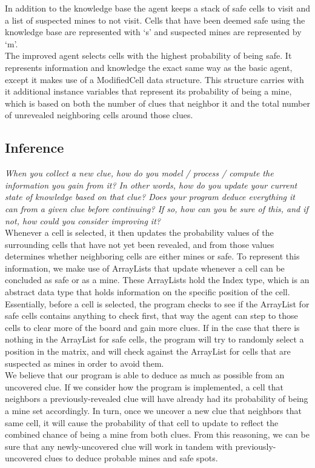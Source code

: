 \documentclass[11pt]{article} %
\begin{document}
In addition to the knowledge base the agent keeps a stack of safe cells to visit and a list of suspected mines to not visit. Cells that have been deemed safe using the knowledge base are represented with ‘s’ and suspected mines are represented by ‘m’.\\

The improved agent selects cells with the highest probability of being safe. It represents information and knowledge the exact same way as the basic agent, except it makes use of a ModifiedCell data structure. This structure carries with it additional instance variables that represent its probability of being a mine, which is based on both the number of clues that neighbor it and the total number of unrevealed neighboring cells around those clues. 

\subsection{Inference}

\textit{When you collect a new clue, how do you model / process / compute the information you gain from it? In other words, how do you update your current state of knowledge based on that clue? Does your program deduce everything it can from a given clue before continuing? If so, how can you be sure of this, and if not, how could you consider improving it?}\\

Whenever a cell is selected, it then updates the probability values of the surrounding cells that have not yet been revealed, and from those values determines whether neighboring cells are either mines or safe. To represent this information, we make use of ArrayLists that update whenever a cell can be concluded as safe or as a mine. These ArrayLists hold the Index type, which is an abstract data type that holds information on the specific position of the cell. Essentially, before a cell is selected, the program checks to see if the ArrayList for safe cells contains anything to check first, that way the agent can step to those cells to clear more of the board and gain more clues. If in the case that there is nothing in the ArrayList for safe cells, the program will try to randomly select a position in the matrix, and will check against the ArrayList for cells that are suspected as mines in order to avoid them.\\

We believe that our program is able to deduce as much as possible from an uncovered clue. If we consider how the program is implemented, a cell that neighbors a previously-revealed clue will have already had its probability of being a mine set accordingly. In turn, once we uncover a new clue that neighbors that same cell, it will cause the probability of that cell to update to reflect the combined chance of being a mine from both clues. From this reasoning, we can be sure that any newly-uncovered clue will work in tandem with previously-uncovered clues to deduce probable mines and safe spots.
\end{document}
